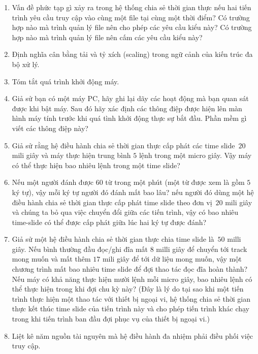 \begin{multicols}{2}
\begin{enumerate}
  \item Vấn đề phức tạp gì xảy ra trong hệ thống chia sẻ thời gian
    thực nếu hai tiến trình yêu cầu truy cập vào cùng một file tại
    cùng một thời điểm? Có trường hợp nào mà trình quản lý file nên
    cho phép các yêu cầu kiểu này? Có trường hợp nào mà trình quản lý
    file nên cấm các yêu cầu kiểu này?

  \item Định nghĩa cân bằng tải và tỷ xích (scaling) trong ngữ cảnh của kiến
    trúc đa bộ xử lý.

  \item Tóm tắt quá trình khởi động máy.

  \item Giả sử bạn có một máy PC, hãy ghi lại dãy các hoạt động mà bạn
    quan sát được khi bật máy. Sau đó hãy xác định các thông điệp được
    hiện lên màn hình máy tính trước khi quá tình khởi động thực sự
    bắt đầu. Phần mềm gì viết các thông điệp này?

  \item Giả sử rằng hệ điều hành chia sẻ thời gian thực cấp phát các time slide~$20$mili
    giây và máy thực hiện trung bình $5$ lệnh trong một micro giây. Vậy máy có thể thực
    hiện bao nhiêu lệnh trong một time slide?

  \item Nếu một người đánh được $60$ từ trong một phút (một từ được xem là gồm $5$ ký tự),
    vậy mỗi ký tự người đó đánh mất bao lâu?  nếu người đó dùng một hệ điều hành chia sẻ
    thời gian thực cấp phát time slide theo đơn vị~$20$ mili giây và chúng ta bỏ qua việc
    chuyển đổi giữa các tiến trình, vậy có bao nhiêu time-slide có thể được cấp phát giữa
    lúc hai ký tự được đánh?


  \item Giả sử một hệ điều hành chia sẻ thời gian thực chia time slide là~$50$ milli
    giây. Nếu bình thường đầu đọc/ghi đĩa mất $8$ milli giây để chuyển tới track mong muốn
    và mất thêm $17$ mili giây để tới dữ liệu mong muốn, vậy một chương trình mất bao
    nhiêu time slide để đợi thao tác đọc đĩa hoàn thành? Nếu máy có khả năng thực hiện
    mười lệnh mỗi micro giây, bao nhiêu lệnh có thể thực hiện trong khi đợi chu kỳ này?
    (Đây là lý do tại sao khi một tiến trình thực hiện một thao tác với thiết bị ngoại vi,
    hệ thống chia sẻ thời gian thực kết thúc time slide của tiến trình này và cho phép
    tiến trình khác chạy trong khi tiến trình ban đầu đợi phục vụ của thiết bị ngoại vi.)


  \item Liệt kê năm nguồn tài nguyên mà hệ điều hành đa nhiệm phải
    điều phối việc truy cập.



\end{enumerate}
\end{multicols}
